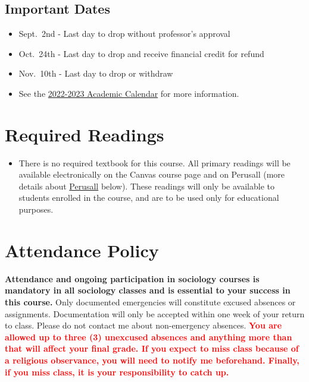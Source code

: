 \documentclass[11pt,]{article}
\providecommand{\tightlist}{%
  \setlength{\itemsep}{0pt}\setlength{\parskip}{0pt}}
\begin{document}
\hypertarget{important-dates}{%
\subsection{Important Dates}\label{important-dates}}

\begin{itemize}
\tightlist
\item
  Sept.~2nd - Last day to drop without professor's approval\\
\item
  Oct.~24th - Last day to drop and receive financial credit for refund\\
\item
  Nov.~10th - Last day to drop or withdraw\\
\item
  See the
  \href{https://www.csuchico.edu/apss/calendar/aca-cal-2022-23.shtml}{2022-2023
  Academic Calendar} for more information.
\end{itemize}

\hypertarget{required-readings}{%
\section{Required Readings}\label{required-readings}}

\begin{itemize}
\tightlist
\item
  There is no required textbook for this course. All primary readings
  will be available electronically on the Canvas course page and on
  Perusall (more details about \protect\hyperlink{perusall}{Perusall}
  below). These readings will only be available to students enrolled in
  the course, and are to be used only for educational purposes.
\end{itemize}

\hypertarget{attendance}{%
\section{Attendance Policy}\label{attendance}}

\textbf{Attendance and ongoing participation in sociology courses is
mandatory in all sociology classes and is essential to your success in
this course.} Only documented emergencies will constitute excused
absences or assignments. Documentation will only be accepted within one
week of your return to class. Please do not contact me about
non-emergency absences.
\textcolor{red}{\bf{You are allowed up to three (3) unexcused absences and anything more than that will affect your final grade. If you expect to miss class because of a religious observance, you will need to notify me beforehand. Finally, if you miss class, it is your responsibility to catch up.}}
\end{document}
